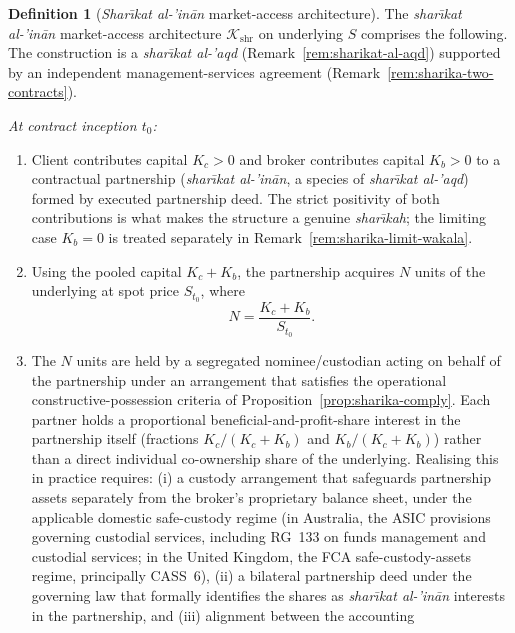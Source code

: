 \documentclass[preprint,12pt,authoryear]{elsarticle}
\theoremstyle{definition}
\newtheorem{definition}{Definition}[section]
\begin{document}
\begin{definition}[\emph{Shar\={\i}kat al-'in\={a}n} market-access
    architecture]
\label{def:sharika}
The \emph{shar\={\i}kat al-'in\={a}n} market-access architecture
$\mathcal{K}_{\text{shr}}$ on underlying $S$ comprises the
following. The construction is a \emph{shar\={\i}kat al-'aqd}
(Remark~\ref{rem:sharikat-al-aqd}) supported by an independent
management-services agreement
(Remark~\ref{rem:sharika-two-contracts}).

\emph{At contract inception $t_0$:}
\begin{enumerate}
    \item Client contributes capital $K_c > 0$ and broker
    contributes capital $K_b > 0$ to a contractual partnership
    (\emph{shar\={\i}kat al-'in\={a}n}, a species of
    \emph{shar\={\i}kat al-'aqd}) formed by executed partnership
    deed. The strict positivity of both contributions is what
    makes the structure a genuine \emph{shar\={\i}kah}; the
    limiting case $K_b = 0$ is treated separately in
    Remark~\ref{rem:sharika-limit-wakala}.
    \item Using the pooled capital $K_c + K_b$, the partnership
    acquires $N$ units of the underlying at spot price
    $S_{t_0}$, where
    \begin{equation}
        N = \frac{K_c + K_b}{S_{t_0}}.
        \label{eq:sharika-N}
    \end{equation}
    \item The $N$ units are held by a segregated
    nominee/custodian acting on behalf of the partnership under
    an arrangement that satisfies the operational
    constructive-possession criteria of
    Proposition~\ref{prop:sharika-comply}. Each partner holds a
    proportional beneficial-and-profit-share interest in the
    partnership itself (fractions $K_c / (K_c + K_b)$ and
    $K_b / (K_c + K_b)$) rather than a direct individual
    co-ownership share of the underlying. Realising this in
    practice requires: (i) a custody arrangement that
    safeguards partnership assets separately from the broker's
    proprietary balance sheet, under the applicable domestic
    safe-custody regime (in Australia, the ASIC provisions
    governing custodial services, including RG~133 on funds
    management and custodial services; in the United Kingdom,
    the FCA safe-custody-assets regime, principally CASS~6),
    (ii) a bilateral partnership deed under the governing law
    that formally identifies the shares as
    \emph{shar\={\i}kat al-'in\={a}n} interests in the
    partnership, and (iii) alignment between the accounting

\end{enumerate}
\end{definition}
\end{document}
